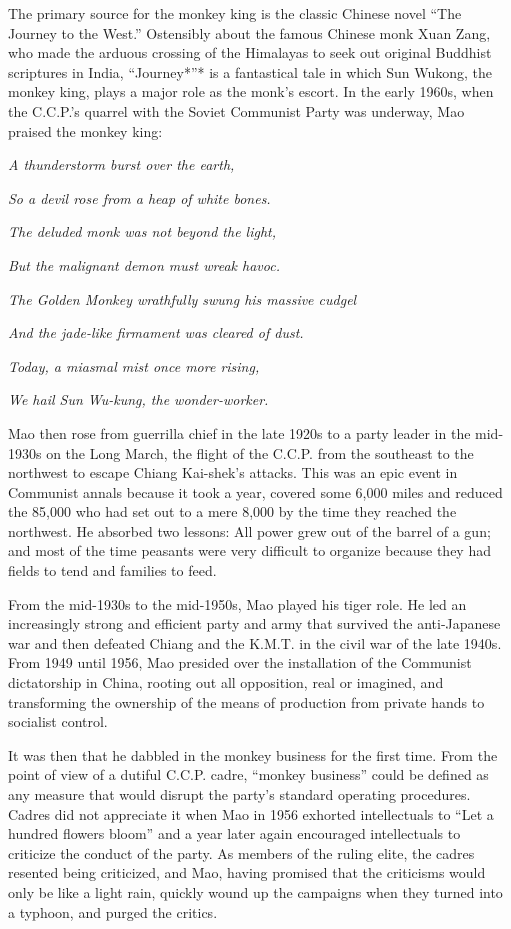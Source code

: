 The primary source for the monkey king is the classic Chinese novel
``The Journey to the West.'' Ostensibly about the famous Chinese monk
Xuan Zang, who made the arduous crossing of the Himalayas to seek out
original Buddhist scriptures in India, ``Journey*''* is a fantastical
tale in which Sun Wukong, the monkey king, plays a major role as the
monk's escort. In the early 1960s, when the C.C.P.'s quarrel with the
Soviet Communist Party was underway, Mao praised the monkey king:

\emph{A thunderstorm burst over the earth,}

\emph{So a devil rose from a heap of white bones.}

\emph{The deluded monk was not beyond the light,}

\emph{But the malignant demon must wreak havoc.}

\emph{The Golden Monkey wrathfully swung his massive cudgel}

\emph{And the jade-like firmament was cleared of dust.}

\emph{Today, a miasmal mist once more rising,}

\emph{We hail Sun Wu-kung, the wonder-worker.}

Mao then rose from guerrilla chief in the late 1920s to a party leader
in the mid-1930s on the Long March, the flight of the C.C.P. from the
southeast to the northwest to escape Chiang Kai-shek's attacks. This was
an epic event in Communist annals because it took a year, covered some
6,000 miles and reduced the 85,000 who had set out to a mere 8,000 by
the time they reached the northwest. He absorbed two lessons: All power
grew out of the barrel of a gun; and most of the time peasants were very
difficult to organize because they had fields to tend and families to
feed.

From the mid-1930s to the mid-1950s, Mao played his tiger role. He led
an increasingly strong and efficient party and army that survived the
anti-Japanese war and then defeated Chiang and the K.M.T. in the civil
war of the late 1940s. From 1949 until 1956, Mao presided over the
installation of the Communist dictatorship in China, rooting out all
opposition, real or imagined, and transforming the ownership of the
means of production from private hands to socialist control.

It was then that he dabbled in the monkey business for the first time.
From the point of view of a dutiful C.C.P. cadre, ``monkey business''
could be defined as any measure that would disrupt the party's standard
operating procedures. Cadres did not appreciate it when Mao in 1956
exhorted intellectuals to ``Let a hundred flowers bloom'' and a year
later again encouraged intellectuals to criticize the conduct of the
party. As members of the ruling elite, the cadres resented being
criticized, and Mao, having promised that the criticisms would only be
like a light rain, quickly wound up the campaigns when they turned into
a typhoon, and purged the critics.

